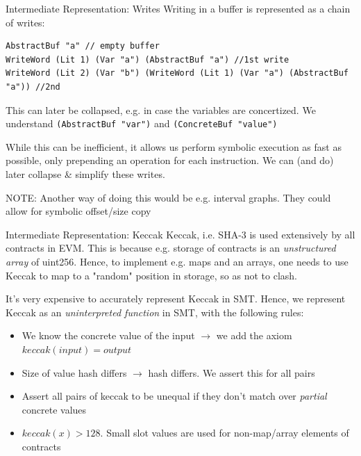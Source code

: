 \documentclass[aspectratio=169]{beamer}
\begin{document}
\begin{frame}[fragile=singleslide]{Intermediate Representation: Writes}
Writing in a buffer is represented as a chain of writes:
\begin{Verbatim}[frame=single, framerule=0.2mm, framesep=2mm,fontsize=\small]
AbstractBuf "a" // empty buffer
WriteWord (Lit 1) (Var "a") (AbstractBuf "a") //1st write
WriteWord (Lit 2) (Var "b") (WriteWord (Lit 1) (Var "a") (AbstractBuf "a")) //2nd
\end{Verbatim}
This can later be collapsed, e.g. in case the variables are concertized. We understand \texttt{(AbstractBuf "var")} and \texttt{(ConcreteBuf "value")}
\bigskip

While this can be inefficient, it allows us perform symbolic execution as fast as possible, only prepending an operation for each instruction. We can (and do) later collapse \& simplify these writes.
\bigskip

NOTE: Another way of doing this would be e.g. interval graphs. They could allow for symbolic offset/size copy
\end{frame}

\begin{frame}[fragile=singleslide]{Intermediate Representation: Keccak}
Keccak, i.e. SHA-3 is used extensively by all contracts in EVM. This is because e.g. storage of contracts is an \emph{unstructured array} of uint256. Hence, to implement e.g. maps and an arrays, one needs to use Keccak to map to a "random" position in storage, so as not to clash.
\bigskip

It's very expensive to accurately represent Keccak in SMT. Hence, we represent Keccak as an \emph{uninterpreted function} in SMT, with the following rules:
\begin{itemize}
\item We know the concrete value of the input $\rightarrow$ we add the axiom $keccak(input)=output$
\item Size of value hash differs $\rightarrow$ hash differs. We assert this for all pairs
\item Assert all pairs of keccak to be unequal if they don't match over \emph{partial} concrete values
\item $keccak(x) > 128$. Small slot values are used for non-map/array elements of contracts
\end{itemize}
\end{frame}
\end{document}
